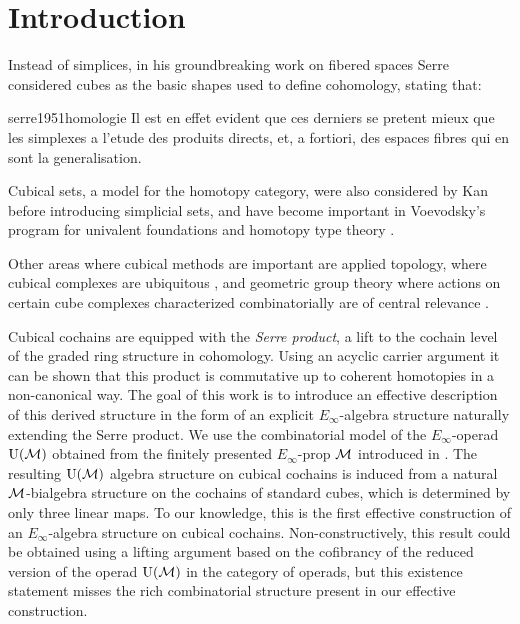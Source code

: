 
\section{Introduction} \label{s:introduction}

Instead of simplices, in his groundbreaking work on fibered spaces Serre considered cubes as the basic shapes used to define cohomology, stating that:

\begin{displaycquote}[p.431]{serre1951homologie}
	Il est en effet evident que ces derniers se pretent mieux que les simplexes a l'etude des produits directs, et, a fortiori, des espaces fibres qui en sont la generalisation.
\end{displaycquote}

Cubical sets, a model for the homotopy category, were also considered by Kan \cite{kan1955abstract, kan1956abstract} before introducing simplicial sets, and have become important in Voevodsky's program for univalent foundations and homotopy type theory \cite{kapulkin2020straightening, mortberg2017cubical}.

Other areas where cubical methods are important are applied topology, where cubical complexes are ubiquitous \cite{tomasz2004computational}, and geometric group theory where actions on certain cube complexes characterized combinatorially are of central relevance \cite{gromov1987hyperbolic, agol2013haken}.

Cubical cochains are equipped with the \textit{Serre product}, a lift to the cochain level of the graded ring structure in cohomology.
Using an acyclic carrier argument it can be shown that this product is commutative up to coherent homotopies in a non-canonical way.
The goal of this work is to introduce an effective description of this derived structure in the form of an explicit $E_\infty$-algebra structure naturally extending the Serre product.
We use the combinatorial model of the $E_\infty$-operad ${\operatorname{U}(\mathcal{M})}$ obtained from the finitely presented $E_\infty$-prop $\mathcal{M}$ introduced in \cite{medina2020prop1}.
The resulting ${\operatorname{U}(\mathcal{M})}$ algebra structure on cubical cochains is induced from a natural $\mathcal{M}$-bialgebra structure on the cochains of standard cubes, which is determined by only three linear maps.
To our knowledge, this is the first effective construction of an $E_\infty$-algebra structure on cubical cochains.
Non-constructively, this result could be obtained using a lifting argument based on the cofibrancy of the reduced version of the operad ${\operatorname{U}(\mathcal{M})}$ in the category of operads, but this existence statement misses the rich combinatorial structure present in our effective construction.

